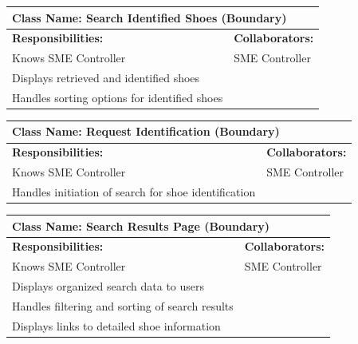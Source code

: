 \documentclass[]{article}
\begin{document}
\begin{table}[H]
    \centering
    \begin{tabular}{|p{}|p{}|}
        \hline
        \multicolumn{2}{|l|}{\textbf{Class Name:} Search Identified Shoes (Boundary)} \\
        \hline
        \textbf{Responsibilities:} & \textbf{Collaborators:} \\
        \hline
        Knows SME Controller & SME Controller \\
        Displays retrieved and identified shoes &  \\
        Handles sorting options for identified shoes &  \\
        \hline
    \end{tabular}
    \label{tab:search_identified_shoes}
\end{table}

\begin{table}[H]
    \centering
    \begin{tabular}{|p{}|p{}|}
        \hline
        \multicolumn{2}{|l|}{\textbf{Class Name:} Request Identification (Boundary)} \\
        \hline
        \textbf{Responsibilities:} & \textbf{Collaborators:} \\
        \hline
        Knows SME Controller & SME Controller \\
        Handles initiation of search for shoe identification &  \\
        \hline
    \end{tabular}
    \label{tab:request_identification}
\end{table}

\begin{table}[h]
    \centering
    \begin{tabular}{|p{}|p{}|}
        \hline
        \multicolumn{2}{|l|}{\textbf{Class Name:} Search Results Page (Boundary)} \\
        \hline
        \textbf{Responsibilities:} & \textbf{Collaborators:} \\
        \hline
        Knows SME Controller & SME Controller \\
        Displays organized search data to users &  \\
        Handles filtering and sorting of search results &  \\
        Displays links to detailed shoe information &  \\
        \hline
    \end{tabular}
    \label{tab:search_results_page}
\end{table}
\end{document}
